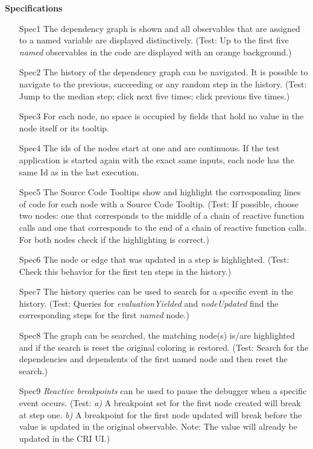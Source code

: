 \noindent\textbf{Specifications}
\begin{itemize}
	\item[Spec1] The dependency graph is shown and all observables that are assigned to a named variable are displayed distinctively. (Test: Up to the first five \emph{named} observables in the code are displayed with an orange background.)
	\item[Spec2] The history of the dependency graph can be navigated. It is possible to navigate to the previous, succeeding or any random step in the history. (Test: Jump to the median step; click next five times; click previous five times.)
	\item[Spec3] For each node, no space is occupied by fields that hold no value in the node itself or its tooltip.
	\item[Spec4] The ids of the nodes start at one and are continuous. If the test application is started again with the exact same inputs, each node has the same Id as in the last execution.
	\item[Spec5] The Source Code Tooltips show and highlight the corresponding lines of code for each node with a Source Code Tooltip. (Test: If possible, choose two nodes: one that corresponds to the middle of a chain of reactive function calls and one that corresponds to the end of a chain of reactive function calls. For both nodes check if the highlighting is correct.)
	\item[Spec6] The node or edge that was updated in a step is highlighted. (Test: Check this behavior for the first ten steps in the history.)
	\item[Spec7] The history queries can be used to search for a specific event in the history. (Test: Queries for \emph{evaluationYielded} and \emph{nodeUpdated} find the corresponding steps for the first \emph{named} node.)
	\item[Spec8] The graph can be searched, the matching node(s) is/are highlighted and if the search is reset the original coloring is restored. (Test: Search for the dependencies and dependents of the first named node and then reset the search.)
	\item[Spec9] \emph{Reactive breakpoints} can be used to pause the debugger when a specific event occurs. (Test: \emph{a)} A breakpoint set for the first node created will break at step one. \emph{b)} A breakpoint for the first node updated will break before the value is updated in the original observable. Note: The value will already be updated in the CRI UI.)
\end{itemize}


